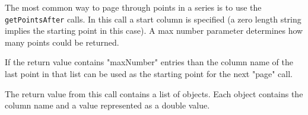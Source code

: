 The most common way to page through points in a series is to use the \verb+getPointsAfter+ calls. In this call
a start column is specified (a zero length string implies the starting point in this case). A max number parameter
determines how many points could be returned.

If the return value contains "maxNumber" entries than the column name of the last point in that list can be
used as the starting point for the next "page" call.

The return value from this call contains a list of objects. Each object contains the column name and a value represented
as a double value.
